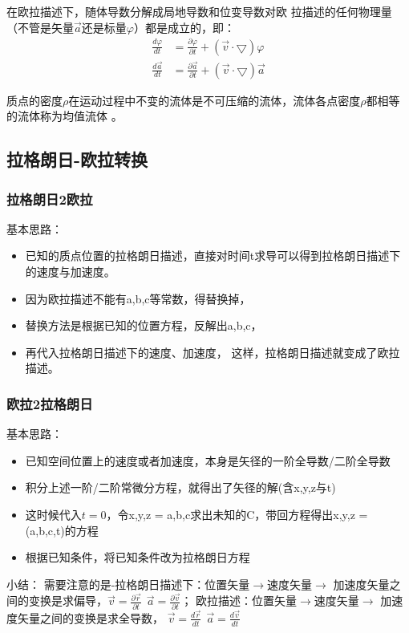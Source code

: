 \documentclass[UTF8,12pt]{article}
\begin{document}
在欧拉描述下，随体导数分解成局地导数和位变导数对欧
拉描述的任何物理量（不管是矢量$\vec a$还是标量$\varphi$）都是成立的，即：
\begin{align*}
    \frac{d\varphi}{dt} &= \frac{\partial \varphi}{\partial t} + (\vec v \cdot \bigtriangledown) \varphi\\
    \frac{d\vec a}{dt} &= \frac{\partial \vec a}{\partial t} + (\vec v \cdot \bigtriangledown) \vec a
\end{align*}

质点的密度$\rho$在运动过程中不变的流体是不可压缩的流体，流体各点密度$\rho$都相等的流体称为均值流体
。
\subsection{拉格朗日-欧拉转换}
\subsubsection{拉格朗日2欧拉}

基本思路：
\begin{itemize}
    \item 已知的质点位置的拉格朗日描述，直接对时间t求导可以得到拉格朗日描述下的速度与加速度。
    \item 因为欧拉描述不能有a,b,c等常数，得替换掉，
    \item 替换方法是根据已知的位置方程，反解出a,b,c，
    \item 再代入拉格朗日描述下的速度、加速度，
    这样，拉格朗日描述就变成了欧拉描述。
\end{itemize}

\subsubsection{欧拉2拉格朗日}

基本思路：
\begin{itemize}
    \item 已知空间位置上的速度或者加速度，本身是矢径的一阶全导数/二阶全导数
    \item 积分上述一阶/二阶常微分方程，就得出了矢径的解(含x,y,z与t)
    \item 这时候代入$t=0$，令x,y,z = a,b,c求出未知的C，带回方程得出x,y,z = (a,b,c,t)的方程
    \item 根据已知条件，将已知条件改为拉格朗日方程
\end{itemize}

小结：{\color{cyan} 需要注意的是}-拉格朗日描述下：位置矢量$\rightarrow$速度矢量$\rightarrow$
加速度矢量之间的变换是求偏导，$\vec v = \frac{\partial \vec r}{\partial t} ~~  \vec a = \frac{\partial \vec v}{\partial t}$；
欧拉描述：位置矢量$\rightarrow$速度矢量$\rightarrow$
加速度矢量之间的变换是求全导数，
$\vec v = \frac{d \vec r}{d t} ~~  \vec a = \frac{d \vec v}{d t}$
\end{document}

